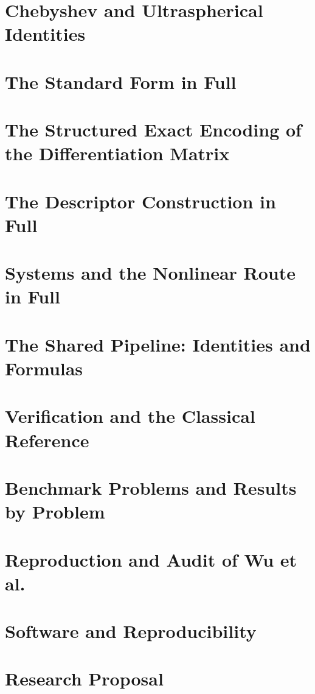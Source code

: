 \section{Chebyshev and Ultraspherical Identities}
\label{app:cheb}


\section{The Standard Form in Full}
\label{app:pihm-residual}


\section{The Structured Exact Encoding of the Differentiation Matrix}
\label{app:structured}


\section{The Descriptor Construction in Full}
\label{app:descriptor}


\section{Systems and the Nonlinear Route in Full}
\label{app:nonlinear}


\section{The Shared Pipeline: Identities and Formulas}
\label{app:pipeline}


\section{Verification and the Classical Reference}
\label{app:verification}


\section{Benchmark Problems and Results by Problem}
\label{app:catalogue}


\section{Reproduction and Audit of Wu et al.}
\label{app:reproduction}


\section{Software and Reproducibility}
\label{app:software}


\section{Research Proposal}
\label{app:proposal}

